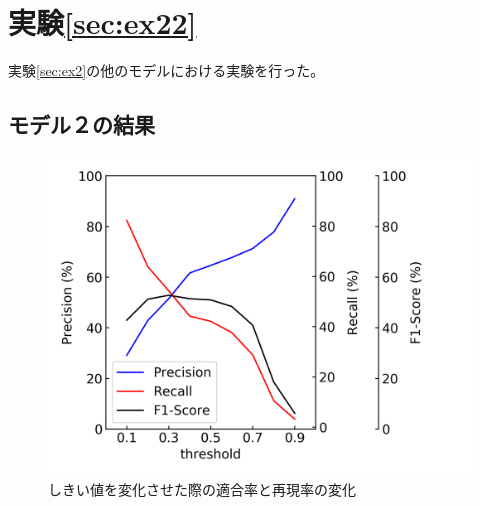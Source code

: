 \section{実験\ref{sec:ex22}}
実験\ref{sec:ex2}の他のモデルにおける実験を行った。

\newpage
\subsection{モデル２の結果}
\begin{figure}[htbp]
    \begin{center}
        \includegraphics[width=150mm]{./fig/resnet3d_ethreshold.png}
        \caption{しきい値を変化させた際の適合率と再現率の変化}
        \label{figresnet3d_e_result_threshold}
    \end{center}
\end{figure}

\newpage
